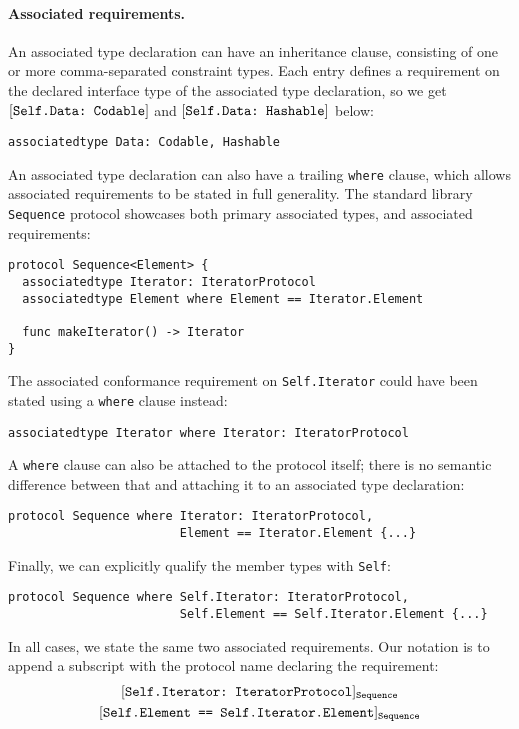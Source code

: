 \documentclass[../generics]{subfiles}
\begin{document}
\paragraph{Associated requirements.}
An associated type declaration can have an inheritance clause, consisting of one or more comma-separated constraint types. Each entry defines a requirement on the declared interface type of the associated type declaration, so we get $[\texttt{Self.Data:~Codable}]$ and $[\texttt{Self.Data:~Hashable}]$ below:
\begin{Verbatim}
associatedtype Data: Codable, Hashable
\end{Verbatim}

An associated type declaration can also have a trailing \texttt{where} clause, which allows associated requirements to be stated in full generality. The standard library \texttt{Sequence} protocol showcases both primary associated types, and associated requirements:
\begin{Verbatim}
protocol Sequence<Element> {
  associatedtype Iterator: IteratorProtocol
  associatedtype Element where Element == Iterator.Element

  func makeIterator() -> Iterator
}
\end{Verbatim}
The associated conformance requirement on \texttt{Self.Iterator} could have been stated using a \texttt{where} clause instead:
\begin{Verbatim}
associatedtype Iterator where Iterator: IteratorProtocol
\end{Verbatim}
A \texttt{where} clause can also be attached to the protocol itself; there is no semantic difference between that and attaching it to an associated type declaration:
\begin{Verbatim}
protocol Sequence where Iterator: IteratorProtocol,
                        Element == Iterator.Element {...}
\end{Verbatim}
Finally, we can explicitly qualify the member types with \texttt{Self}:
\begin{Verbatim}
protocol Sequence where Self.Iterator: IteratorProtocol,
                        Self.Element == Self.Iterator.Element {...}
\end{Verbatim}
In all cases, we state the same two associated requirements. Our notation is to append a subscript with the protocol name declaring the requirement:
\begin{gather*}
\ConfReq{Self.Iterator}{IteratorProtocol}_\texttt{Sequence}\\
\SameReq{Self.Element}{Self.Iterator.Element}_\texttt{Sequence}
\end{gather*}
\end{document}
